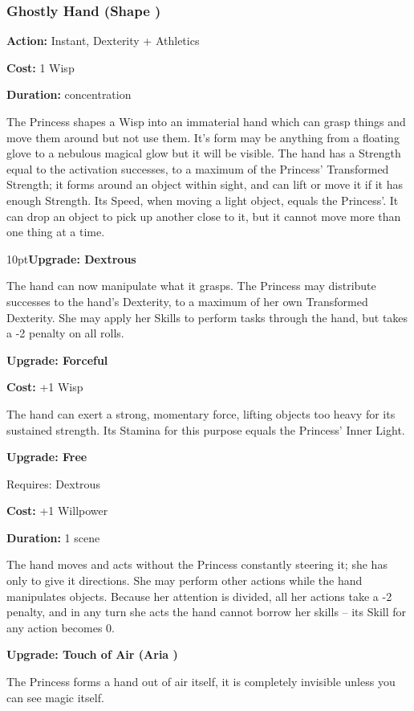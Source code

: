 \subsubsection*{Ghostly Hand (Shape \textbullet\textbullet)}

\noindent \textbf{Action:} Instant, Dexterity + Athletics

\noindent \textbf{Cost:} 1 Wisp

\noindent \textbf{Duration:} concentration

The Princess shapes a Wisp into an immaterial hand which can grasp things and move them around but not use them. It's form may be anything from a floating glove to a nebulous magical glow but it will be visible. The hand has a Strength equal to the activation successes, to a maximum of the Princess' Transformed Strength; it forms around an object within sight, and can lift or move it if it has enough Strength. Its Speed, when moving a light object, equals the Princess'. It can drop an object to pick up another close to it, but it cannot move more than one thing at a time.

\begin{myindentpar}{10pt}\textbf{Upgrade: Dextrous}

The hand can now manipulate what it grasps. The Princess may distribute successes to the hand's Dexterity, to a maximum of her own Transformed Dexterity. She may apply her Skills to perform tasks through the hand, but takes a -2 penalty on all rolls.

\textbf{Upgrade: Forceful}

\noindent \textbf{Cost:} +1 Wisp

The hand can exert a strong, momentary force, lifting objects too heavy for its sustained strength. Its Stamina for this purpose equals the Princess' Inner Light.

\textbf{Upgrade: Free}

\noindent Requires: Dextrous

\noindent \textbf{Cost:} +1 Willpower

\noindent \textbf{Duration:} 1 scene

The hand moves and acts without the Princess constantly steering it; she has only to give it directions. She may perform other actions while the hand manipulates objects. Because her attention is divided, all her actions take a -2 penalty, and in any turn she acts the hand cannot borrow her skills -- its Skill for any action becomes 0.

\textbf{Upgrade: Touch of Air (Aria \textbullet\textbullet)}

The Princess forms a hand out of air itself, it is completely invisible unless you can see magic itself.\end{myindentpar}

